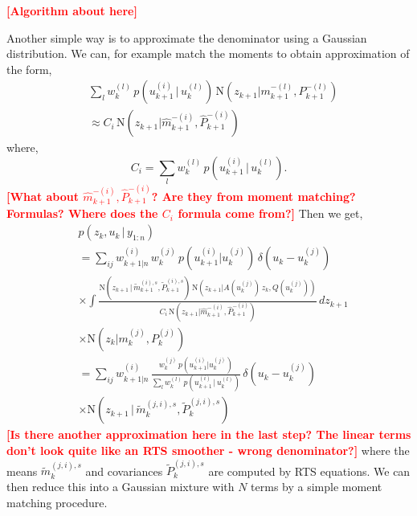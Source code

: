 \documentclass[twocolumn]{autart}    %
\newcommand{\comment}[1]{\textcolor{red}{\textbf{[#1]}}}
\begin{document}
\comment{Algorithm about here}

Another simple way is to approximate the denominator using a Gaussian distribution. We can, for example match the moments to obtain approximation of the form,
%
\begin{equation}
\begin{split}
  &\sum_l w_k^{(l)} \, p(u_{k+1}^{(i)}\,|\,u_k^{(l)}) \,
            \mathrm{N}(z_{k+1} | m^{-(l)}_{k+1}, P^{-(l)}_{k+1}) \\
  &\approx
  C_i \, \mathrm{N}(z_{k+1} | \hat{m}^{-(i)}_{k+1}, \hat{P}^{-(i)}_{k+1})
\end{split}
\end{equation}
%
where,
%
\begin{equation}
  C_i = \sum_l w_k^{(l)} \, p(u_{k+1}^{(i)}\,|\,u_k^{(l)}).
\end{equation}
\comment{What about $\hat{m}^{-(i)}_{k+1}, \hat{P}^{-(i)}_{k+1}$? Are they from moment matching? Formulas? Where does the $C_i$ formula come from?}
%
Then we get,
%
\begin{equation}
\begin{split}
 &p(z_{k},u_{k} \,|\, y_{1:n}) \\
 &= \sum_{ij} w^{(i)}_{k+1|n} \, w_k^{(j)} \,
      p(u_{k+1}^{(i)} | u_k^{(j)}) \, \delta(u_{k} - u_{k}^{(j)}) \\
 &\times \int
    \frac{\mathrm{N}(z_{k+1}\,|\,\tilde{m}_{k+1}^{(i),s},\tilde{P}_{k+1}^{(i),s}) \,
          \mathrm{N}(z_{k+1} | A(u_k^{(j)}) \, z_k, Q(u_k^{(j)}))}
        {C_i \, \mathrm{N}(z_{k+1} | \hat{m}^{-(i)}_{k+1}, \hat{P}^{-(i)}_{k+1})} \, dz_{k+1} \\
 &\times \mathrm{N}(z_{k} | m^{(j)}_{k}, P^{(j)}_{k}) \\
 &= \sum_{ij} w^{(i)}_{k+1|n} \,
    \frac{w_k^{(j)} \, p(u_{k+1}^{(i)} | u_k^{(j)})}
         {\sum_l w_k^{(l)} \, p(u_{k+1}^{(i)}\,|\,u_k^{(l)})} \, \delta(u_{k} - u_{k}^{(j)}) \\
 &\times \mathrm{N}(z_{k+1}\,|\,\tilde{m}_{k}^{(j,i),s},\tilde{P}_{k}^{(j,i),s}) \,
\end{split}
\label{eq:simplerbrw}
\end{equation}
%
\comment{Is there another approximation here in the last step? The linear terms don't look quite like an RTS smoother - wrong denominator?}
where the means $\tilde{m}_{k}^{(j,i),s}$ and covariances $\tilde{P}_{k}^{(j,i),s}$ are computed by RTS equations. We can then reduce this into a Gaussian mixture with $N$ terms by a simple moment matching procedure.
\end{document}
